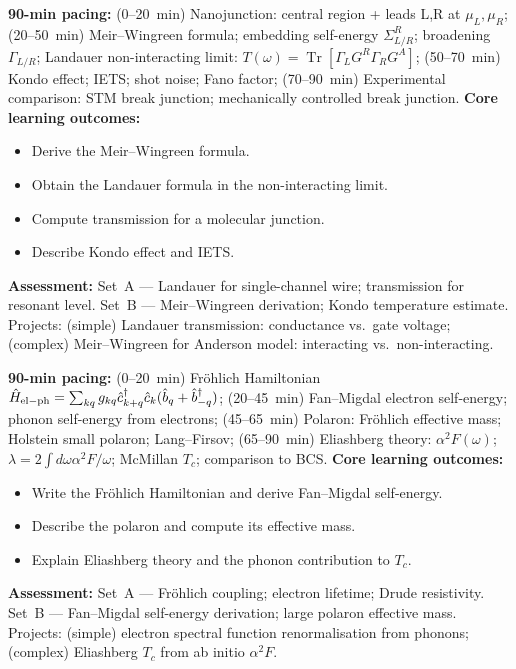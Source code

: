 \documentclass[11pt,a4paper]{article}
\begin{document}
\medskip

\begin{tcolorbox}[modulebox, title={Module~II.5 --- Lecture L08: Steady-State Transport}]
\textbf{90-min pacing:} (0--20~min) Nanojunction: central region + leads L,R at $\mu_L,\mu_R$; (20--50~min) Meir--Wingreen formula; embedding self-energy $\Sigma^R_{L/R}$; broadening $\Gamma_{L/R}$; Landauer non-interacting limit: $T(\omega)=\operatorname{Tr}[\Gamma_L G^R\Gamma_R G^A]$; (50--70~min) Kondo effect; IETS; shot noise; Fano factor; (70--90~min) Experimental comparison: STM break junction; mechanically controlled break junction.
\medskip\textbf{Core learning outcomes:}
\begin{itemize}[leftmargin=1.4em,topsep=2pt,itemsep=1pt]
  \item Derive the Meir--Wingreen formula.
  \item Obtain the Landauer formula in the non-interacting limit.
  \item Compute transmission for a molecular junction.
  \item Describe Kondo effect and IETS.
\end{itemize}
\medskip\textbf{Assessment:}
Set~A --- Landauer for single-channel wire; transmission for resonant level.
Set~B --- Meir--Wingreen derivation; Kondo temperature estimate.
Projects: (simple) Landauer transmission: conductance vs.\ gate voltage; (complex) Meir--Wingreen for Anderson model: interacting vs.\ non-interacting.
\end{tcolorbox}

\medskip

\begin{tcolorbox}[modulebox, title={Module~II.5 --- Lecture L09: Electron--Phonon Coupling}]
\textbf{90-min pacing:} (0--20~min) Fr\"ohlich Hamiltonian $\hat{H}_{\rm el-ph}=\sum_{kq}g_{kq}\hat{c}^\dagger_{k+q}\hat{c}_k(\hat{b}_q+\hat{b}^\dagger_{-q})$; (20--45~min) Fan--Migdal electron self-energy; phonon self-energy from electrons; (45--65~min) Polaron: Fr\"ohlich effective mass; Holstein small polaron; Lang--Firsov; (65--90~min) Eliashberg theory: $\alpha^2F(\omega)$; $\lambda=2\int d\omega\alpha^2F/\omega$; McMillan $T_c$; comparison to BCS.
\medskip\textbf{Core learning outcomes:}
\begin{itemize}[leftmargin=1.4em,topsep=2pt,itemsep=1pt]
  \item Write the Fr\"ohlich Hamiltonian and derive Fan--Migdal self-energy.
  \item Describe the polaron and compute its effective mass.
  \item Explain Eliashberg theory and the phonon contribution to $T_c$.
\end{itemize}
\medskip\textbf{Assessment:}
Set~A --- Fr\"ohlich coupling; electron lifetime; Drude resistivity.
Set~B --- Fan--Migdal self-energy derivation; large polaron effective mass.
Projects: (simple) electron spectral function renormalisation from phonons; (complex) Eliashberg $T_c$ from ab initio $\alpha^2F$.
\end{tcolorbox}
\end{document}
